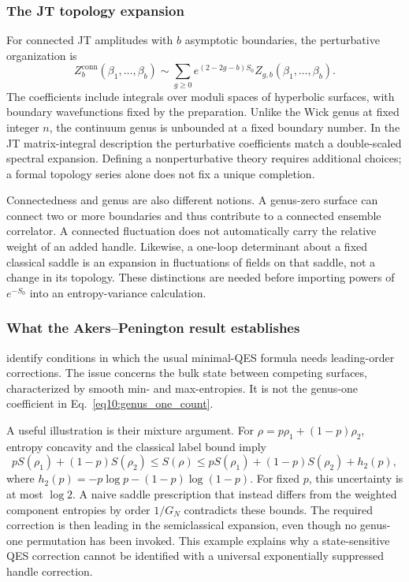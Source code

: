 \documentclass[11pt,letterpaper]{article}
\theoremstyle{plain}
\theoremstyle{definition}
\theoremstyle{remark}
\begin{document}
\subsubsection{The JT topology expansion}
For connected JT amplitudes with $b$ asymptotic boundaries, the perturbative
organization is~\citep{saadetal2019}
\begin{equation}
 Z_b^{\mathrm{conn}}(\beta_1,\ldots,\beta_b)
 \sim\sum_{g\geq0}e^{(2-2g-b)S_0}
 Z_{g,b}(\beta_1,\ldots,\beta_b).
 \label{eq10:genus_expansion}
\end{equation}
The coefficients include integrals over moduli spaces of hyperbolic surfaces,
with boundary wavefunctions fixed by the preparation.  Unlike the Wick genus
at fixed integer $n$, the continuum genus is unbounded at a fixed boundary
number.  In the JT matrix-integral description the perturbative coefficients
match a double-scaled spectral expansion.  Defining a nonperturbative theory
requires additional choices; a formal topology series alone does not fix a
unique completion.

Connectedness and genus are also different notions.  A genus-zero surface
can connect two or more boundaries and thus contribute to a connected
ensemble correlator.  A connected fluctuation does not automatically carry
the relative weight of an added handle.  Likewise, a one-loop determinant
about a fixed classical saddle is an expansion in fluctuations of fields on
that saddle, not a change in its topology.  These distinctions are needed
before importing powers of $e^{-S_0}$ into an entropy-variance calculation.

\subsubsection{What the Akers--Penington result establishes}
\citet{akerspenington2021} identify conditions in which the usual minimal-QES
formula needs leading-order corrections.  The issue concerns the bulk state
between competing surfaces, characterized by smooth min- and max-entropies.
It is not the genus-one coefficient in Eq.~\eqref{eq10:genus_one_count}.

A useful illustration is their mixture argument.  For
$\rho=p\rho_1+(1-p)\rho_2$, entropy concavity and the classical label bound
imply
\begin{equation}
 pS(\rho_1)+(1-p)S(\rho_2)
 \leq S(\rho)
 \leq pS(\rho_1)+(1-p)S(\rho_2)+h_2(p),
 \label{eq10:akers_penington}
\end{equation}
where $h_2(p)=-p\log p-(1-p)\log(1-p)$.  For fixed $p$, this uncertainty
is at most $\log2$.  A naive saddle prescription that instead differs from
the weighted component entropies by order $1/G_N$ contradicts these bounds.
The required correction is then leading in the semiclassical expansion,
even though no genus-one permutation has been invoked.  This example
explains why a state-sensitive QES correction cannot be identified with a
universal exponentially suppressed handle correction.
\end{document}
